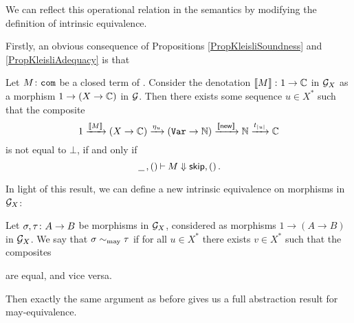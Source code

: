 \documentclass[11pt]{report}
\begin{document}
We can reflect this operational relation in the semantics by modifying the definition of intrinsic equivalence.  

Firstly, an obvious consequence of Propositions \ref{PropKleisliSoundness} and \ref{PropKleisliAdequacy} is that

\begin{corollary}
  Let $M\colon{\mathtt{com}}$ be a closed term of \IAX.  
  Consider the denotation $\left\llbracket M\right\rrbracket\colon 1 \to \mathbb{C}$ in $\mathcal G_X$ as a morphism $1 \to (X \to \mathbb{C})$ in $\mathcal G$.  
  Then there exists some sequence $u\in X^*$ such that the composite
  \[
    1 \xrightarrow{\left\llbracket M\right\rrbracket}
    (X \to \mathbb{C}) \xrightarrow{\eta_u}
    ({\mathtt{Var}} \to \mathbb{N}) \xrightarrow{\left\llbracket\operatorname{{\mathsf{new}}}\right\rrbracket}
    \mathbb{N} \xrightarrow{t_{|u|}}
    \mathbb{C}
    \]
  is not equal to $\bot$, if and only if
  \[
    \,\underline{\hspace{1.5ex}}\,,()\mathbin{\vdash} M \Downarrow {\mathsf{skip}},()\,.
    \]
  \label{CorMayAdequacy}
\end{corollary}

In light of this result, we can define a new intrinsic equivalence on morphisms in $\mathcal G_X$:

\begin{definition}
  Let $\sigma,\tau\colon A \to B$ be morphisms in $\mathcal G_X$, considered as morphisms $1 \to (A \to B)$ in $\mathcal G_X$.  
  We say that $\sigma \sim_{\operatorname{may}} \tau$ if for all $u\in X^*$ there exists $v\in X^*$ such that the composites
  are equal, and vice versa.
  \label{DefMayIntrinsicEquivalence}
\end{definition}

Then exactly the same argument as before gives us a full abstraction result for may-equivalence.
\end{document}

